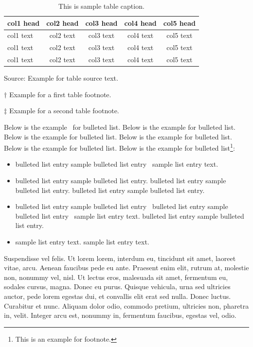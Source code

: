 \documentclass[APA,LATO1COL]{WileyNJD-v2}
\begin{document}
\begin{center}
\begin{table}[t]%
\centering
\caption{This is sample table caption.\label{tab2}}%
\begin{tabular*}{500pt}{@{\extracolsep\fill}lcccc@{\extracolsep\fill}}
\toprule
\textbf{col1 head} & \textbf{col2 head}  & \textbf{col3 head}  & \textbf{col4 head}  & \textbf{col5 head} \\
\midrule
col1 text & col2 text  & col3 text  & col4 text  & col5 text\tnote{$\dagger$}   \\
col1 text & col2 text  & col3 text  & col4 text  & col5 text   \\
col1 text & col2 text  & col3 text  & col4 text  & col5 text\tnote{$\ddagger$}   \\
\bottomrule
\end{tabular*}
\begin{tablenotes}
\item Source: Example for table source text.
\item[$\dagger$] Example for a first table footnote.
\item[$\ddagger$] Example for a second table footnote.
\end{tablenotes}
\end{table}
\end{center}



Below is the example~\cite{Rothermel1998,Yoo2007,Schulz2012} for bulleted list. Below is the example for bulleted list. Below is the example for bulleted list. Below is the example for bulleted list. Below is the example for bulleted list. Below is the example for bulleted list\footnote{This is an example for footnote.}:
\begin{itemize}
\item bulleted list entry sample bulleted list entry~\cite{Allen2011} sample list entry text. 
\item bulleted list entry sample bulleted list entry. bulleted list entry sample bulleted list entry. bulleted list entry sample bulleted list entry.
\item bulleted list entry sample bulleted list entry~\cite{Ballen2011} bulleted list entry sample bulleted list entry~\citet{Allen2011} sample list entry text.  bulleted list entry sample bulleted list entry.
\item sample list entry text. sample list entry text.  
\end{itemize}

Suspendisse vel felis. Ut lorem lorem, interdum eu, tincidunt sit amet, laoreet vitae, arcu. Aenean faucibus pede eu
ante. Praesent enim elit, rutrum at, molestie non, nonummy vel, nisl. Ut lectus eros, malesuada sit amet, fermentum
eu, sodales cursus, magna. Donec eu purus. Quisque vehicula, urna sed ultricies auctor, pede lorem egestas dui, et
convallis elit erat sed nulla. Donec luctus. Curabitur et nunc. Aliquam dolor odio, commodo pretium, ultricies non,
pharetra in, velit. Integer arcu est, nonummy in, fermentum faucibus, egestas vel, odio.
\end{document}
